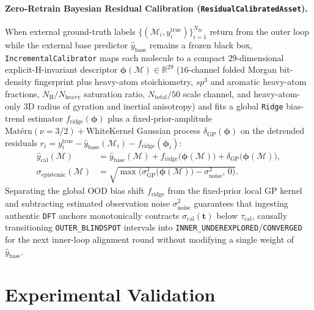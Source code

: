 \documentclass[11pt,a4paper]{article}
\begin{document}
\paragraph{Zero-Retrain Bayesian Residual Calibration (\texttt{ResidualCalibratedAsset}).}
When external ground-truth labels $\{(\mathcal{M}_i, y_i^{\text{true}})\}_{i=1}^{N_{\text{fb}}}$ return from the outer loop while the external base predictor $\hat{y}_{\text{base}}$ remains a frozen black box, \texttt{IncrementalCalibrator} maps each molecule to a compact $29$-dimensional explicit-H-invariant descriptor $\boldsymbol{\phi}(\mathcal{M}) \in \mathbb{R}^{29}$ ($16$-channel folded Morgan bit-density fingerprint plus heavy-atom stoichiometry, $sp^3$ and aromatic heavy-atom fractions, $N_{\text{H}}/N_{\text{heavy}}$ saturation ratio, $N_{\text{total}}/50$ scale channel, and heavy-atom-only 3D radius of gyration and inertial anisotropy) and fits a global \texttt{Ridge} bias-trend estimator $f_{\text{ridge}}(\boldsymbol{\phi})$ plus a fixed-prior-amplitude $\text{Mat\'ern}(\nu=3/2) + \text{WhiteKernel}$ Gaussian process $\delta_{\text{GP}}(\boldsymbol{\phi})$ on the detrended residuals $r_i = y_i^{\text{true}} - \hat{y}_{\text{base}}(\mathcal{M}_i) - f_{\text{ridge}}(\boldsymbol{\phi}_i)$:
\begin{equation}
\label{eq:rescal}
\begin{aligned}
\hat{y}_{\text{cal}}(\mathcal{M}) &= \hat{y}_{\text{base}}(\mathcal{M}) + f_{\text{ridge}}\!\big(\boldsymbol{\phi}(\mathcal{M})\big) + \delta_{\text{GP}}\!\big(\boldsymbol{\phi}(\mathcal{M})\big), \\
\sigma_{\text{epistemic}}(\mathcal{M}) &= \sqrt{\max\!\Big(\sigma_{\text{GP}}^2\big(\boldsymbol{\phi}(\mathcal{M})\big) - \sigma_{\text{noise}}^2,\, 0\Big)}.
\end{aligned}
\end{equation}
Separating the global OOD bias shift $f_{\text{ridge}}$ from the fixed-prior local GP kernel and subtracting estimated observation noise $\sigma_{\text{noise}}^2$ guarantees that ingesting authentic \texttt{DFT} anchors monotonically contracts $\sigma_{\text{cal}}(\mathbf{t})$ below $\tau_{\text{cal}}$, causally transitioning \texttt{OUTER\_BLINDSPOT} intervals into \texttt{INNER\_UNDEREXPLORED}/\texttt{CONVERGED} for the next inner-loop alignment round without modifying a single weight of $\hat{y}_{\text{base}}$.

\section{Experimental Validation}
\label{sec:experiments}
\end{document}
